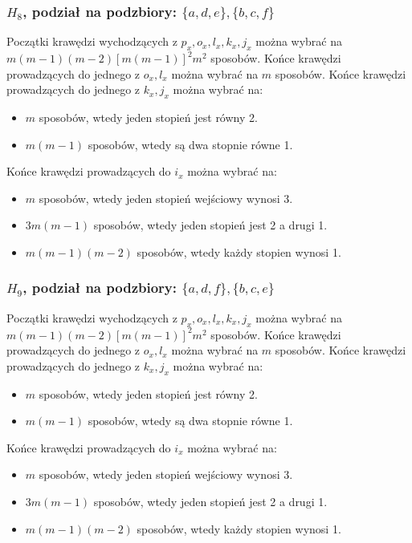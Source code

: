 \documentclass{article}
\begin{document}
\subsubsection{$H_8$, podział na podzbiory: $\{ a,d,e \}, \{ b,c,f \}$}
Początki krawędzi wychodzących z $p_x, o_x, l_x, k_x, j_x$ można wybrać na $m(m-1)(m-2)[m(m-1)]^2m^2$ sposobów. Końce krawędzi prowadzących do jednego z $o_x, l_x$ można wybrać na $m$ sposobów. Końce krawędzi prowadzących do jednego z $k_x,j_x$ można wybrać na:
\begin{itemize}
  \item $m$ sposobów, wtedy jeden stopień jest równy 2.
  \item $m(m-1)$ sposobów, wtedy są dwa stopnie równe 1.
\end{itemize}
Końce krawędzi prowadzących do $i_x$ można wybrać na:
\begin{itemize}
  \item $m$ sposobów, wtedy jeden stopień wejściowy wynosi 3.
  \item $3m(m-1)$ sposobów, wtedy jeden stopień jest 2 a drugi 1.
  \item $m(m-1)(m-2)$ sposobów, wtedy każdy stopien wynosi 1.
\end{itemize}

\subsubsection{$H_9$, podział na podzbiory: $\{ a,d,f \}, \{ b,c,e \}$}
Początki krawędzi wychodzących z $p_x, o_x, l_x, k_x, j_x$ można wybrać na $m(m-1)(m-2)[m(m-1)]^2m^2$ sposobów. Końce krawędzi prowadzących do jednego z $o_x, l_x$ można wybrać na $m$ sposobów. Końce krawędzi prowadzących do jednego z $k_x,j_x$ można wybrać na:
\begin{itemize}
  \item $m$ sposobów, wtedy jeden stopień jest równy 2.
  \item $m(m-1)$ sposobów, wtedy są dwa stopnie równe 1.
\end{itemize}
Końce krawędzi prowadzących do $i_x$ można wybrać na:
\begin{itemize}
  \item $m$ sposobów, wtedy jeden stopień wejściowy wynosi 3.
  \item $3m(m-1)$ sposobów, wtedy jeden stopień jest 2 a drugi 1.
  \item $m(m-1)(m-2)$ sposobów, wtedy każdy stopien wynosi 1.
\end{itemize}
\end{document}
